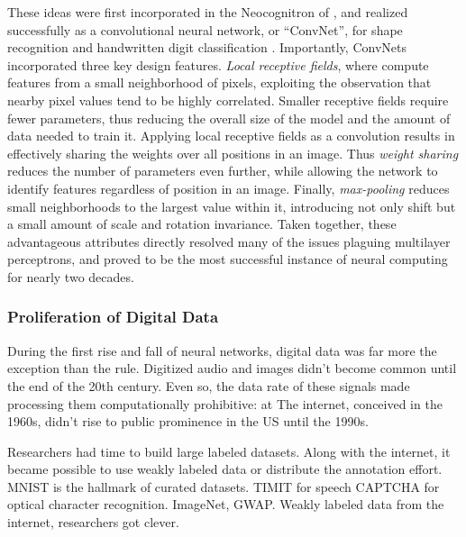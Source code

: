 These ideas were first incorporated in the Neocognitron of \cite{Fukushima1988}, and realized successfully as a convolutional neural network, or ``ConvNet'', for shape recognition and handwritten digit classification \cite{LeCun1990, LeCun1998}.
Importantly, ConvNets incorporated three key design features.
\emph{Local receptive fields}, where compute features from a small neighborhood of pixels, exploiting the observation that nearby pixel values tend to be highly correlated.
Smaller receptive fields require fewer parameters, thus reducing the overall size of the model and the amount of data needed to train it.
Applying local receptive fields as a convolution results in effectively sharing the weights over all positions in an image.
Thus \emph{weight sharing} reduces the number of parameters even further, while allowing the network to identify features regardless of position in an image.
Finally, \emph{max-pooling} reduces small neighborhoods to the largest value within it, introducing not only shift but a small amount of scale and rotation invariance.
Taken together, these advantageous attributes directly resolved many of the issues plaguing multilayer perceptrons, and proved to be the most successful instance of neural computing for nearly two decades.


\subsubsection{Proliferation of Digital Data}
\label{subsec:perceptrons}

During the first rise and fall of neural networks, digital data was far more the exception than the rule.
Digitized audio and images didn't become common until the end of the 20th century.
Even so, the data rate of these signals made processing them computationally prohibitive: at
The internet, conceived in the 1960s, didn't rise to public prominence in the US until the 1990s.

Researchers had time to build large labeled datasets.
Along with the internet, it became possible to use weakly labeled data or distribute the annotation effort.
MNIST is the hallmark of curated datasets.
TIMIT for speech
CAPTCHA for optical character recognition.
ImageNet, GWAP.
Weakly labeled data from the internet, researchers got clever.

